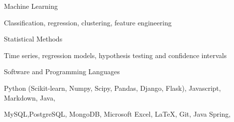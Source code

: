 \begin{cventries}
  \cventry
    {Machine Learning}
    {}
    {}
    {}
    {
      \begin{cvitems}
        \item {Classification, regression, clustering, feature engineering}
      \end{cvitems}
    }
  \cventry
    {Statistical Methods}
    {}
    {}
    {}
    {
      \begin{cvitems}
        \item {Time series, regression models, hypothesis testing and confidence intervals}
      \end{cvitems}
    }
  \cventry
    {Software and Programming Languages}
    {}
    {}
    {}
    {
      \begin{cvitems}
        \item { Python (Scikit-learn, Numpy, Scipy, Pandas, Django, Flask), Javascript, Markdown, Java},
        \item { MySQL,PostgreSQL, MongoDB, Microsoft Excel, LaTeX, Git, Java Spring,}
      \end{cvitems}
    }
\end{cventries}
